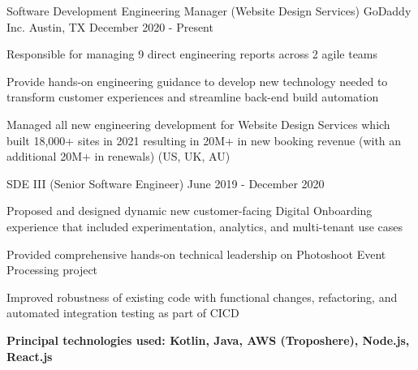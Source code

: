 

\begin{cventries}

  \cventry
    {Software Development Engineering Manager (Website Design Services)} %
    {GoDaddy Inc.} %
    {Austin, TX} %
    {December 2020 - Present} %
    {
      \begin{cvitems} %
        \item {Responsible for managing 9 direct engineering reports across 2 agile teams}
        \item {Provide hands-on engineering guidance to develop new technology needed to transform customer experiences and
streamline back-end build automation}
        \item {Managed all new engineering development for Website Design Services which built 18,000+ sites in 2021 resulting in 20M+ in new booking revenue (with an additional 20M+ in renewals) (US, UK, AU)}
      \end{cvitems}
    }

  \cventry
    {SDE III (Senior Software Engineer)} %
    {} %
    {} %
    {June 2019 - December 2020} %
    {
      \begin{cvitems} %
              \item {Proposed and designed dynamic new customer-facing Digital Onboarding experience that included experimentation, analytics, and multi-tenant use cases}
        \item {Provided comprehensive hands-on technical leadership on Photoshoot Event Processing project}
        \item {Improved robustness of existing code with functional changes, refactoring, and automated integration testing as part of CICD}
        \item {\textbf{Principal technologies used: Kotlin, Java, AWS (Troposhere), Node.js, React.js}}
      \end{cvitems}
    }


\end{cventries}
